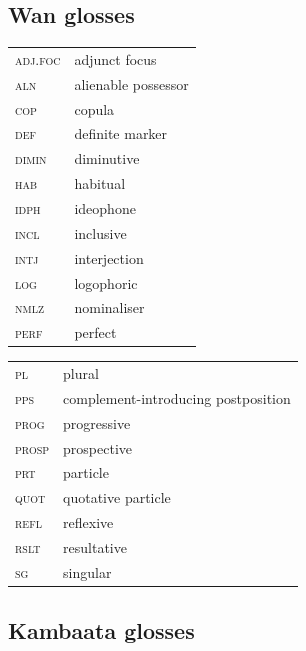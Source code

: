 \documentclass[output=paper,colorlinks,citecolor=brown]{langscibook}
\begin{document}
\subsection*{Wan glosses}

\begin{tabularx}{.45\textwidth}{lQ}
\textsc{adj.foc} & adjunct focus\\
\textsc{aln} & alienable possessor\\
\textsc{cop} & copula\\
\textsc{def} & definite marker\\
\textsc{dimin} & diminutive\\
\textsc{hab} & habitual\\
\textsc{idph} & ideophone\\
\textsc{incl} & inclusive\\
\textsc{intj} & interjection\\
\textsc{log} & logophoric\\
\textsc{nmlz} & nominaliser\\
\textsc{perf} & perfect\\
\end{tabularx}
\begin{tabularx}{.45\textwidth}{lQ}
\textsc{pl} & plural\\
\textsc{pps} & complement-introducing postposition\\
\textsc{prog} & progressive\\
\textsc{prosp} & prospective\\
\textsc{prt} & particle\\
\textsc{quot} & quotative particle\\
\textsc{refl} & reflexive\\
\textsc{rslt} & resultative\\
\textsc{sg} & singular\\
\end{tabularx}


\subsection*{Kambaata glosses}
\end{document}

